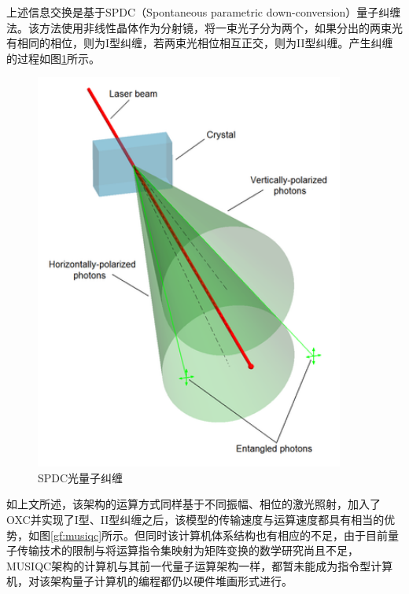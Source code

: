 \documentclass[UTF8, 11pt, a4paper]{ctexart}
\begin{document}
上述信息交换是基于SPDC（Spontaneous parametric down-conversion）量子纠缠法\cite{spdc}。该方法使用非线性晶体作为分射镜，将一束光子分为两个，如果分出的两束光有相同的相位，则为I型纠缠，若两束光相位相互正交，则为II型纠缠。产生纠缠的过程如图\ref{gf:spdc}所示。

\begin{figure}
\begin{center}
\includegraphics[width=4in]{spdc}
\caption{SPDC光量子纠缠}
\label{gf:spdc}
\end{center}
\end{figure}

如上文所述，该架构的运算方式同样基于不同振幅、相位的激光照射，加入了OXC并实现了I型、II型纠缠之后，该模型的传输速度与运算速度都具有相当的优势，如图\ref{gf:musiqc}所示。但同时该计算机体系结构也有相应的不足，由于目前量子传输技术的限制与将运算指令集映射为矩阵变换的数学研究尚且不足，MUSIQC架构的计算机与其前一代量子运算架构一样，都暂未能成为指令型计算机，对该架构量子计算机的编程都仍以硬件堆画形式进行。
\end{document}
